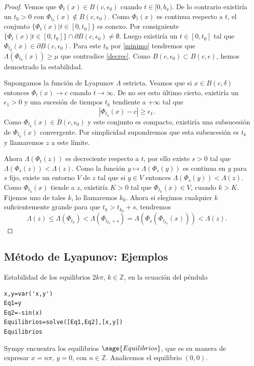 \begin{proof}
 Vemos que $\Phi_t(x)\in B(c,\epsilon_0)$ cuando $t\in [0,b_x)$. De lo contrario existiría un $t_0>0$ con 
$\Phi_{t_0}(x)\notin B(c,\epsilon_0)$. Como $\Phi_t(x)$ es continua respecto a $t$, el conjunto 
$\{\Phi_t(x)|t\in[0,t_0]\}$ es conexo. Por consiguiente 
$ \{\Phi_t(x)|t\in[0,t_0]\}\cap \partial B(c,\epsilon_0)\neq\emptyset$. Luego existiría un $t\in[0,t_0]$ tal que
$\Phi_{t_0}(x)\in \partial B(c,\epsilon_0)$. Para este $t_0$ por \eqref{minimo} tendremos que 
$\Lambda(\Phi_{t_0}(x))\geq \mu$ que contradice \eqref{decrec}. Como $B(c,\epsilon_0)\subset B(c,\epsilon)$, hemos
demostrado la estabilidad. 

 
Supongamos la función de Lyapunov $\Lambda$ estricta. Veamos que si $x\in B(c,\delta)$ entonces 
$\Phi_t(x)\to c$ cuando $t\to\infty$. De no ser esto último cierto, existiría un 
$\epsilon_1>0$ y una sucesión de tiempos $t_k$ tendiente a $+\infty$ tal que
\[
 |\Phi_{t_k}(x)-c|\geq \epsilon_1.
\]
Como $\Phi_{t_k}(x)\in \overline{B}(c,\epsilon_0)$ y este conjunto es compacto, existiría una subsucesión de $\Phi_{t_k}(x)$
convergente. Por simplicidad supondremos que esta subsucesión es $t_k$ y llamaremos $z$ a este límite. 

 
 
Ahora $\Lambda(\Phi_t(z))$ es decreciente respecto a $t$, por ello existe $s>0$ tal que $\Lambda(\Phi_s(z))<\Lambda(z)$. Como
la función $y \mapsto \Lambda(\Phi_s(y))$ es continua en $y$ para $s$ fijo, existe un entorno $V$ de $z$ tal que si 
$y\in V$ entonces $\Lambda(\Phi_s(y))<\Lambda(z)$. Como  $\Phi_{t_k}(x)$ tiende a $z$, existiría $K>0$ tal que 
$\Phi_{t_k}(x)\in V$, cuando $k>K$. Fijemos uno de tales $k$, lo llamaremos $k_0$. Ahora si elegimos cualquier $k$
suficientemente grande para que $t_k>t_{k_0}+s$, tendremos
\[\Lambda(z)\leq \Lambda(\Phi_{t_k})<\Lambda(\Phi_{t_{k_0}+s})=\Lambda(\Phi_s(\Phi_{t_{k_0}}(x)))<\Lambda(z).\]


\end{proof}




\subsection{Método de Lyapunov: Ejemplos}

\begin{ejemplo}{} Estabilidad de los equilibrios $2k\pi$, $k\in\mathbb{Z}$, en la ecuación del péndulo

\end{ejemplo}
\begin{lstlisting}
x,y=var('x,y')
Eq1=y
Eq2=-sin(x)
Equilibrios=solve([Eq1,Eq2],[x,y])
Equilibrios
\end{lstlisting}
Sympy encuentra los equilibrios $\sage{Equilibrios}$, que es su manera de expresar $x=n\pi$, $y=0$, con $n\in\mathbb{Z}$. Analicemos el equilibrio $(0,0)$. 

